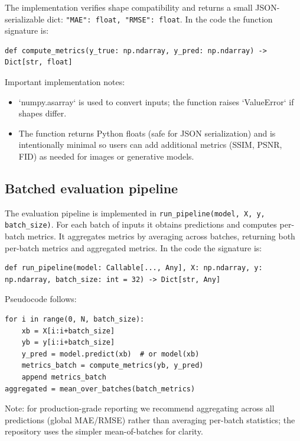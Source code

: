 \documentclass[11pt]{article}
\begin{document}
The implementation verifies shape compatibility and returns a small JSON-serializable dict: \texttt{{"MAE": float, "RMSE": float}}.
In the code the function signature is:

\begin{verbatim}
def compute_metrics(y_true: np.ndarray, y_pred: np.ndarray) -> Dict[str, float]
\end{verbatim}

Important implementation notes:
\begin{itemize}
  \item `numpy.asarray` is used to convert inputs; the function raises `ValueError` if shapes differ.
  \item The function returns Python floats (safe for JSON serialization) and is intentionally minimal so users can add additional metrics (SSIM, PSNR, FID) as needed for images or generative models.
\end{itemize}

\subsection{Batched evaluation pipeline}
The evaluation pipeline is implemented in \texttt{run\_pipeline(model, X, y, batch\_size)}. For each batch of inputs it obtains predictions and computes per-batch metrics. It aggregates metrics by averaging across batches, returning both per-batch metrics and aggregated metrics. In the code the signature is:

\begin{verbatim}
def run_pipeline(model: Callable[..., Any], X: np.ndarray, y: np.ndarray, batch_size: int = 32) -> Dict[str, Any]
\end{verbatim}

Pseudocode follows:

\begin{verbatim}
for i in range(0, N, batch_size):
    xb = X[i:i+batch_size]
    yb = y[i:i+batch_size]
    y_pred = model.predict(xb)  # or model(xb)
    metrics_batch = compute_metrics(yb, y_pred)
    append metrics_batch
aggregated = mean_over_batches(batch_metrics)
\end{verbatim}

Note: for production-grade reporting we recommend aggregating across all predictions (global MAE/RMSE) rather than averaging per-batch statistics; the repository uses the simpler mean-of-batches for clarity.
\end{document}
